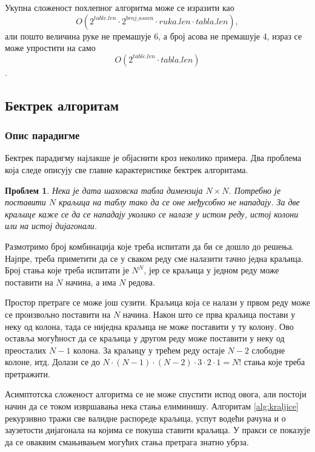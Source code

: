 \documentclass[a4paper, 12pt, ngerman]{article}
\let\oldsubsection\subsection
\renewcommand\subsection{\clearpage\oldsubsection}
\newtheorem{problem}{Проблем}
\begin{document}
Укупна сложеност похлепног алгоритма може се изразити као $$O(2^{table.len} \cdot 2^{broj\_asova} \cdot ruka.len \cdot tabla.len),$$ али пошто величина руке не премашује 6, а број асова не премашује 4, израз се може упростити на само $$O(2^{table.len} \cdot tabla.len)$$.
\subsection{Бектрек алгоритам}
\subsubsection{Опис парадигме}
Бектрек парадигму најлакше је објаснити кроз неколико примера. Два проблема која следе описују све главне карактеристике бектрек алгоритама.

\begin{problem}
Нека је дата шаховска табла димензија $N \times N$. Потребно је поставити $N$ краљица на таблу тако да се оне међусобно не нападају. За две краљице каже се да се нападају уколико се налазе у истом реду, истој колони или на истој дијагонали.
\end{problem}

Размотримо број комбинација које треба испитати да би се дошло до решења. Најпре, треба приметити да се у сваком реду сме налазити тачно једна краљица. Број стања које треба испитати је $N^N$, јер се краљица у једном реду може поставити на $N$ начина, а има $N$ редова.

Простор претраге се може још сузити. Краљица која се налази у првом реду може се произвољно поставити на $N$ начина. Након што се прва краљица постави у неку од колона, тада се ниједна краљица не може поставити у ту колону. Ово оставља могућност да се краљица у другом реду може поставити у неку од преосталих $N - 1$ колона. За краљицу у трећем реду остаје $N - 2$ слободне колоне, итд. Долази се до $N \cdot (N-1) \cdot (N-2) \cdot 3 \cdot 2 \cdot 1 = N!$ стања које треба претражити.

Асимптотска сложеност алгоритма се не може спустити испод овога, али постоји начин да се током извршавања нека стања елиминишу. Алгоритам \ref{alg:kraljice} рекурзивно тражи све валидне распореде краљица, успут водећи рачуна и о заузетости дијагонала на којима се покуша ставити краљица. У пракси се показује да се оваквим смањивањем могућих стања претрага знатно убрза. 
\end{document}
